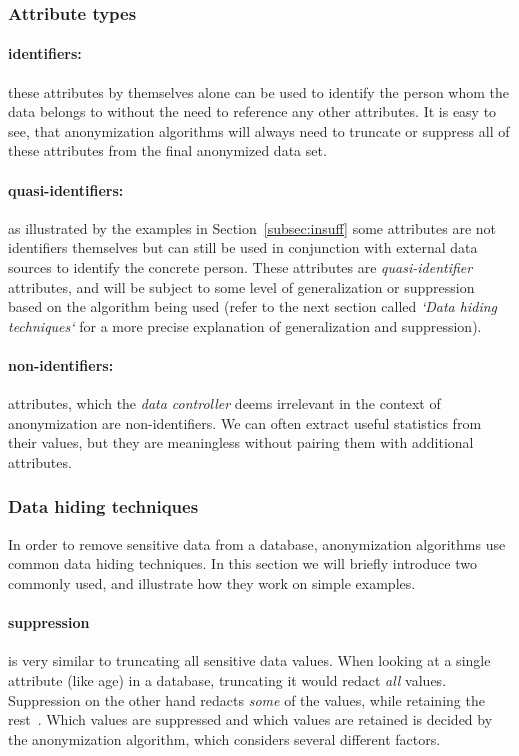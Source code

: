 \subsubsection{Attribute types}

\paragraph{identifiers:} these attributes by themselves alone can be used to identify the person whom the data belongs to without the need to reference any other attributes.
It is easy to see, that anonymization algorithms will always need to truncate or suppress all of these attributes from the final anonymized data set.

\paragraph{quasi-identifiers:} as illustrated by the examples in Section~\ref{subsec:insuff} some attributes are not identifiers themselves but can still be used in conjunction with external data sources to identify the concrete person.
These attributes are \textit{quasi-identifier} attributes, and will be subject to some level of generalization or suppression based on the algorithm being used (refer to the next section called \textit{`Data hiding techniques`} for a more precise explanation of generalization and suppression).

\paragraph{non-identifiers:} attributes, which the \textit{data controller} deems irrelevant in the context of anonymization are non-identifiers.
We can often extract useful statistics from their values, but they are meaningless without pairing them with additional attributes.

\subsubsection{Data hiding techniques} In order to remove sensitive data from a database, anonymization algorithms use common data hiding techniques.
In this section we will briefly introduce two commonly used, and illustrate how they work on simple examples.

\paragraph{suppression} is very similar to truncating all sensitive data values.
When looking at a single attribute (like age) in a database, truncating it would redact \textit{all} values.
Suppression on the other hand redacts \textit{some} of the values, while retaining the rest~\cite{aggarwal}.
Which values are suppressed and which values are retained is decided by the anonymization algorithm, which considers several different factors.

